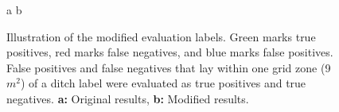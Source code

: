 \documentclass[11pt, review]{elsarticle} %
\begin{document}
\begin{figure} [!htb]
    \centering
    a{
        }\hspace{5pt}
    b{
        }
    \caption{Illustration of the modified evaluation labels. Green marks true positives, red marks false negatives, and blue marks false positives. False positives and false negatives that lay within one grid zone (9 $m^2$) of a ditch label were evaluated as true positives and true negatives. \textbf{a:} Original results, \textbf{b:} Modified results. }
    \label{fig:newlabels}
\end{figure}
\end{document}
